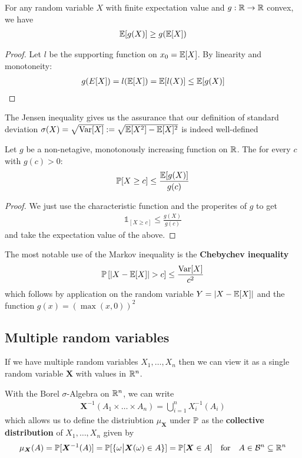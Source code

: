 \begin{prop}
  For any random variable $X$ with finite expectation value and $g: \mathbb{R} \to  \mathbb{R}$ convex, we have
  \begin{align*}
    \mathbb{E}[g(X)] \geq g(\mathbb{E}[X])
  \end{align*}
\end{prop}
\begin{proof}
  Let $l$ be the supporting function on $x_0 = \mathbb{E}[X]$. By linearity and monotoneity:
  \begin{align*}
    g(E[X]) = l(\mathbb{E}[X]) = \mathbb{E}[l(X)] \leq \mathbb{E}[g(X)] 
  \end{align*}
\end{proof}
The Jensen inequality gives us the assurance that our definition of standard deviation $\sigma(X) = \sqrt{\text{Var}[X]} := \sqrt{\mathbb{E}[X^{2}] - \mathbb{E}[X]^{2}}$ is indeed well-defined

\begin{prop}
  Let $g$ be a non-netagive, monotonously increasing function on $\mathbb{R}$. The for every $c$ with $g(c) >0$:
  \begin{align*}
    \mathbb{P}[X \geq c] \leq \frac{\mathbb{E}[g(X)]}{g(c)}
  \end{align*}
\end{prop}
\begin{proof}
We just use the characteristic function and the properites of $g$ to get
\begin{align*}
  \mathds{1}_{[X \geq c]} \leq \frac{g(X)}{g(c)}
\end{align*}
and take the expectation value of the above.
\end{proof}



The most notable use of the Markov inequality is the \textbf{Chebychev inequality}
\begin{align*}
  \mathbb{P}\left[\vert X - \mathbb{E}[X]\vert > c\right] \leq \frac{\text{Var}[X]}{c^{2}}
\end{align*}
which follows by application on the random variable $Y = \vert X - \mathbb{E}[X]\vert$ and the function $g(x) = \left(
  \max(x,0)
\right)^{2}$

\subsection{Multiple random variables}
If we have multiple random variables $X_{1}, \ldots, X_{n}$ then we can view it as a single random variable $\bm{X}$ with values in $\mathbb{R}^{n}$.

With the Borel $\sigma$-Algebra on $\mathbb{R}^{n}$, we can write
\begin{align*}
  \bm{X}^{-1}(A_1 \times \ldots \times A_n) = \bigcup_{i=1}^{n}X_i^{-1}(A_i)
\end{align*}
which allows us to define the distriubtion $\mu_{\bm{X}}$ under $\mathbb{P}$ as the \textbf{collective distribution} of $X_{1}, \ldots, X_{n}$ given by
\begin{align*}
  \mu_{\bm{X}}(A) = \mathbb{P}[\bm{X}^{-1}(A)] = \mathbb{P}[\{\omega \big\vert \bm{X}(\omega) \in A\}] = \mathbb{P}[\bm{X} \in A] \quad \text{for} \quad A \in \mathcal{B}^{n} \subseteq \mathbb{R}^{n}
\end{align*}


